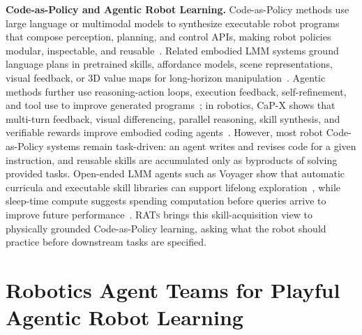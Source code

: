 \documentclass{llmxive}
\begin{document}
\textbf{Code-as-Policy and Agentic Robot Learning.}
Code-as-Policy methods use large language or multimodal models to synthesize executable robot programs that compose perception, planning, and control APIs, making robot policies modular, inspectable, and reusable~\citep{liang2023code, singh2023progprompt, vemprala2024chatgpt, mu2024robocodexmultimodalcodegeneration, geminirobotics1d52025, shi2025maestro}. Related embodied LMM systems ground language plans in pretrained skills, affordance models, scene representations, visual feedback, or 3D value maps for long-horizon manipulation~\citep{ahn2022saycan, driess2023palme, huang2023voxposer, zeng2023socratic, mu2023embodied}. Agentic methods further use reasoning-action loops, execution feedback, self-refinement, and tool use to improve generated programs~\citep{yao2023react, shinn2023reflexion, madaan2023selfrefine, chen2024selfdebug}; in robotics, CaP-X shows that multi-turn feedback, visual differencing, parallel reasoning, skill synthesis, and verifiable rewards improve embodied coding agents~\citep{fu2026capx}. However, most robot Code-as-Policy systems remain task-driven: an agent writes and revises code for a given instruction, and reusable skills are accumulated only as byproducts of solving provided tasks. Open-ended LMM agents such as Voyager show that automatic curricula and executable skill libraries can support lifelong exploration~\citep{wang2023voyager}, while sleep-time compute suggests spending computation before queries arrive to improve future performance~\citep{lin2025sleeptime}. \textsc{RATs} brings this skill-acquisition view to physically grounded Code-as-Policy learning, asking what the robot should practice before downstream tasks are specified.


	
\section{Robotics Agent Teams for Playful Agentic Robot Learning}
\label{sec:method}
\end{document}

